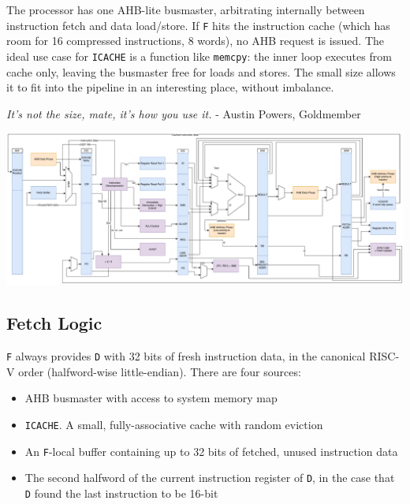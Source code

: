 \documentclass{article}
\begin{document}
The processor has one AHB-lite busmaster, arbitrating internally between instruction fetch and data load/store. If \texttt{F} hits the instruction cache (which has room for 16 compressed instructions, 8 words), no AHB request is issued. The ideal use case for \texttt{ICACHE} is a function like \texttt{memcpy}: the inner loop executes from cache only, leaving the busmaster free for loads and stores. The small size allows it to fit into the pipeline in an interesting place, without imbalance.

\begin{displayquote}
\textit{It's not the size, mate, it's how you use it.} - Austin Powers, Goldmember
\end{displayquote}


\newpage

\begin{center}
	\begin{sideways}
		\begin{minipage}{\textheight}
			\includegraphics[width=\textheight]{diagrams/cpu_full.pdf}
			\label{diagram:cpu_pipeline}
		\end{minipage}
	\end{sideways}
\end{center}

\newpage

\subsection{Fetch Logic}

\texttt{F} always provides \texttt{D} with 32 bits of fresh instruction data, in the canonical RISC-V order (halfword-wise little-endian). There are four sources:

\begin{itemize}
\item AHB busmaster with access to system memory map
\item \texttt{ICACHE}. A small, fully-associative cache with random eviction
\item An \texttt{F}-local buffer containing up to 32 bits of fetched, unused instruction data
\item The second halfword of the current instruction register of \texttt{D}, in the case that \texttt{D} found the last instruction to be 16-bit
\end{itemize}
\end{document}
